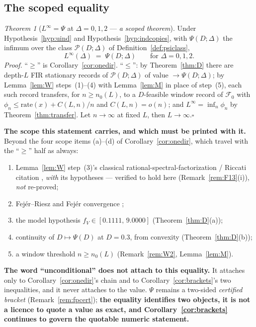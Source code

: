 \documentclass[11pt]{article}
\theoremstyle{definition}
\theoremstyle{remark}
\newtheorem{namedthm}{Theorem}
\begin{document}
\subsection{The scoped equality}
\label{sec:scopedequality}

\begin{namedthm}[$L^\infty=\Psi$ at $\Delta=0,1,2$ --- \emph{a scoped
theorem}]
\label{thm:equality}
Under Hypothesis~\ref{hyp:uind} and Hypothesis~\ref{hyp:indcopies}, with
$\Psi(D;\Delta)$ the infimum over the class $\mathcal P(D;\Delta)$ of
Definition~\ref{def:psiclass},
\[
\boxed{\;L^\infty(\Delta)\;=\;\Psi(D;\Delta)\qquad\text{for }\Delta=0,1,2.\;}
\]
\emph{Proof.} ``$\ge$'' is Corollary~\ref{cor:onedir}. ``$\le$'': by
Theorem~\ref{thm:D} there are depth-$L$ FIR stationary records of
$\mathcal P(D;\Delta)$ of value $\to\Psi(D;\Delta)$; by
Lemma~\ref{lem:W} steps~(1)--(4) with Lemma~\ref{lem:M} in place of
step~(5), each such record transfers, for $n\ge n_0(L)$, to a $D$-feasible
window record of $\mathcal F_0$ with
$\phi_n\le\mathrm{rate}(x)+C(L,n)/n$ and $C(L,n)=o(n)$; and
$L^\infty=\inf_n\phi_n$ by Theorem~\ref{thm:transfer}. Let $n\to\infty$ at
fixed $L$, then $L\to\infty$.\hfill$\square$

\medskip\noindent\textbf{The scope this statement carries, and which must be
printed with it.} Beyond the four scope items (a)--(d) of
Corollary~\ref{cor:onedir}, which travel with the ``$\ge$'' half as always:
\begin{enumerate}
\item[(i)] Lemma~\ref{lem:W} step~(3)'s classical
rational-spectral-factorization / Riccati citation \cite{bib:am79,bib:ksh00},
\emph{with} its hypotheses --- verified to hold here
(Remark~\ref{rem:F13}(i)), \emph{not} re-proved;
\item[(ii)] Fej\'er--Riesz \cite{bib:fejer16,bib:riesz16} and Fej\'er
convergence \cite{bib:fejer04};
\item[(iii)] the model hypothesis $f_V\in[0.1111,\,9.0000]$
(Theorem~\ref{thm:D}(a));
\item[(iv)] continuity of $D\mapsto\Psi(D)$ at $D=0.3$, from convexity
(Theorem~\ref{thm:D}(b));
\item[(v)] a window threshold $n\ge n_0(L)$ (Remark~\ref{rem:W2},
Lemma~\ref{lem:M}).
\end{enumerate}
\textbf{The word ``unconditional'' does not attach to this equality.} It
attaches only to Corollary~\ref{cor:onedir}'s chain and to
Corollary~\ref{cor:brackets}'s two inequalities, and it never attaches to the
value. $\Psi$ remains a two-sided \emph{certified bracket}
(Remark~\ref{rem:fpcert}); \textbf{the equality identifies two objects, it is
not a licence to quote a value as exact, and
Corollary~\ref{cor:brackets} continues to govern the quotable numeric
statement.}
\end{namedthm}
\end{document}
